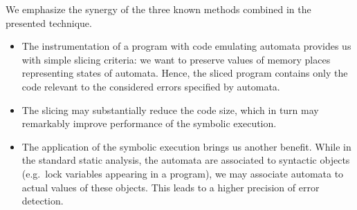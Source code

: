 We emphasize the synergy of the three known methods combined in the
presented technique.
\begin{itemize}
\item The instrumentation of a program with code emulating automata provides us
with simple slicing criteria: we want to preserve values of memory places
representing states of automata. Hence, the sliced program contains only the
code relevant to the considered errors specified by automata.
\item The slicing may substantially reduce the code size, which in turn may
remarkably improve performance of the symbolic execution.
\item The application of the symbolic execution brings us another benefit.
While in the standard static analysis, the automata are associated to
syntactic objects (e.g.\ lock variables appearing in a program), we may
associate automata to actual values of these objects. This leads to a higher
precision of error detection.
\end{itemize}





